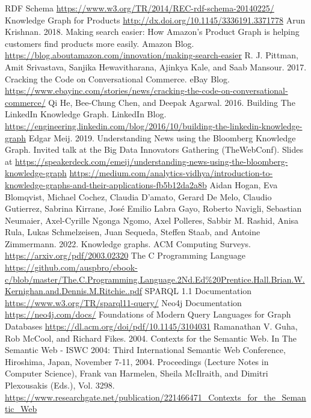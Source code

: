 \documentclass[conference]{IEEEtran}
\begin{document}
\begin{thebibliography}{00}
 RDF Schema \url{https://www.w3.org/TR/2014/REC-rdf-schema-20140225/}
 Knowledge Graph for Products \url{http://dx.doi.org/10.1145/3336191.3371778}
 Arun Krishnan. 2018. Making search easier: How Amazon’s Product Graph is helping customers find products more easily. Amazon Blog. \url{https://blog.aboutamazon.com/innovation/making-search-easier}
 R. J. Pittman, Amit Srivastava, Sanjika Hewavitharana, Ajinkya Kale, and Saab Mansour. 2017. Cracking the Code on Conversational Commerce. eBay Blog. \url{https://www.ebayinc.com/stories/news/cracking-the-code-on-conversational-commerce/}
 Qi He, Bee-Chung Chen, and Deepak Agarwal. 2016. Building The LinkedIn Knowledge Graph. LinkedIn Blog. \url{https://engineering.linkedin.com/blog/2016/10/building-the-linkedin-knowledge-graph}
 Edgar Meij. 2019. Understanding News using the Bloomberg Knowledge Graph. Invited talk at the Big Data Innovators Gathering (TheWebConf). Slides at \url{https://speakerdeck.com/emeij/understanding-news-using-the-bloomberg-knowledge-graph}
 \url{https://medium.com/analytics-vidhya/introduction-to-knowledge-graphs-and-their-applications-fb5b12da2a8b}
 Aidan Hogan, Eva Blomqvist, Michael Cochez, Claudia D’amato, Gerard De Melo, Claudio Gutierrez, Sabrina Kirrane, José Emilio Labra Gayo, Roberto Navigli, Sebastian Neumaier, Axel-Cyrille Ngonga Ngomo, Axel Polleres, Sabbir M. Rashid, Anisa Rula, Lukas Schmelzeisen, Juan Sequeda, Steffen Staab, and Antoine Zimmermann. 2022. Knowledge graphs. ACM Computing Surveys. \url{https://arxiv.org/pdf/2003.02320}
 The C Programming Language \url{https://github.com/auspbro/ebook-c/blob/master/The.C.Programming.Language.2Nd.Ed%20Prentice.Hall.Brian.W.Kernighan.and.Dennis.M.Ritchie..pdf}
 SPARQL 1.1 Documentation \url{https://www.w3.org/TR/sparql11-query/}
 Neo4j Documentation 
\url{https://neo4j.com/docs/}
 Foundations of Modern Query Languages for Graph
Databases \url{https://dl.acm.org/doi/pdf/10.1145/3104031}
 Ramanathan V. Guha, Rob McCool, and Richard Fikes. 2004. Contexts for the Semantic Web. In The Semantic Web -
ISWC 2004: Third International Semantic Web Conference, Hiroshima, Japan, November 7-11, 2004. Proceedings (Lecture
Notes in Computer Science), Frank van Harmelen, Sheila McIlraith, and Dimitri Plexousakis (Eds.), Vol. 3298. \url{https://www.researchgate.net/publication/221466471_Contexts_for_the_Semantic_Web}


\end{thebibliography}
\end{document}
